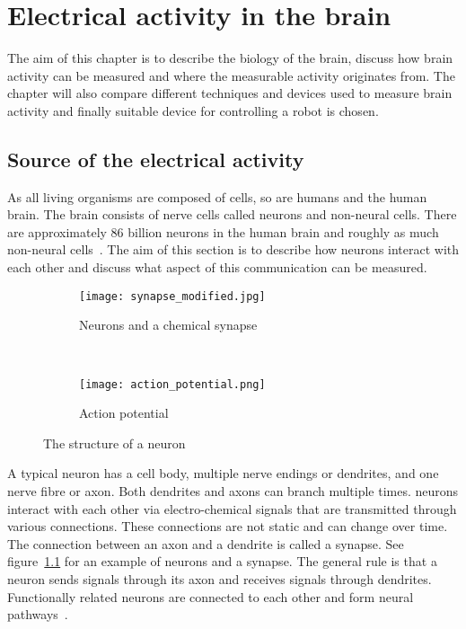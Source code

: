 
\chapter{Electrical activity in the brain}

The aim of this chapter is to describe the biology of the brain, discuss how brain activity can be measured and where the measurable activity originates from. The chapter will also compare different techniques and devices used to measure brain activity and finally suitable device for controlling a robot is chosen.

\section{Source of the electrical activity}
\label{sec:neuron}

As all living organisms are composed of cells, so are humans and the human brain. The brain consists of nerve cells called \glspl{neuron} and non-neural cells. There are approximately 86 billion \glspl{neuron} in the human brain and roughly as much non-neural cells~\cite{neuroncount}. The aim of this section is to describe how \glspl{neuron} interact with each other and discuss what aspect of this communication can be measured.

\begin{figure}[b!]
	\centering
	\begin{subfigure}{0.48\textwidth}
		\texttt{[image: synapse\_modified.jpg]}
		\caption{Neurons and a chemical synapse~\cite[p.~17]{neuronpic}}
		\label{fig:neuron_synapse}
	\end{subfigure}
	~
	\begin{subfigure}{0.48\textwidth}
		\texttt{[image: action\_potential.png]}
		\caption{Action potential~\cite{action_potential_pic}}
		\label{fig:action_potential}
	\end{subfigure}
	\caption{The structure of a neuron}
\end{figure}

A typical \gls{neuron} has a cell body, multiple nerve endings or \glspl{dendrite}, and one nerve fibre or \gls{axon}. Both \glspl{dendrite} and \glspl{axon} can branch multiple times. \Glspl{neuron} interact with each other via electro-chemical signals that are transmitted through various connections. These connections are not static and can change over time. The connection between an \gls{axon} and a \gls{dendrite} is called a \gls{synapse}. See figure~\ref{fig:neuron_synapse} for an example of \glspl{neuron} and a \gls{synapse}. The general rule is that a \gls{neuron} sends signals through its \gls{axon} and receives signals through \glspl{dendrite}. Functionally related \glspl{neuron} are connected to each other and form \glspl{neural pathway}~\cite{neuralpathway}.

